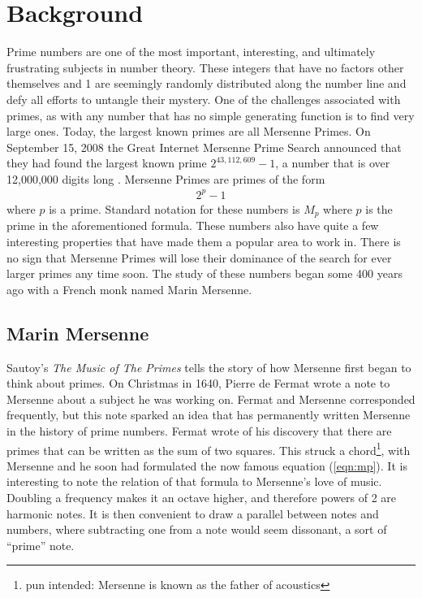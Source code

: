 \section{Background}

Prime numbers are one of the most important, interesting, and ultimately frustrating subjects in number theory. These integers that have no factors other themselves and 1 are seemingly randomly distributed along the number line and defy all efforts to untangle their mystery. One of the challenges associated with primes, as with any number that has no simple generating function is to find very large ones.  Today, the largest known primes are all Mersenne Primes.  On September 15, 2008 the Great Internet Mersenne Prime Search announced that they had found the largest known prime $2^{43,112,609}-1$, a number that is over 12,000,000 digits long \cite{gimps}.  Mersenne Primes are primes of the form 
\begin{align}
2^p - 1
\label{eqn:mp}
\end{align}
where $p$ is a prime.  Standard notation for these numbers is $M_p$ where $p$ is the prime in the aforementioned formula.   These numbers also have quite a few interesting properties that have made them a popular area to work in. There is no sign that Mersenne Primes will lose their dominance of the search for ever larger primes any time soon.  The study of these numbers began some 400 years ago with a French monk named Marin Mersenne. 

\subsection{Marin Mersenne}

Sautoy's \textit{The Music of The Primes} \cite{sautoy} tells the story of how Mersenne first began to think about primes. On Christmas in 1640, Pierre de Fermat wrote a note to Mersenne about a subject he was working on. Fermat and Mersenne corresponded frequently, but this note sparked an idea that has permanently written Mersenne in the history of prime numbers. Fermat wrote of his discovery that there are primes that can be written as the sum of two squares.  This struck a chord\footnote{pun intended: Mersenne is known as the father of acoustics}, with Mersenne and he soon had formulated the now famous equation (\ref{eqn:mp}).  It is interesting to note the relation of that formula to Mersenne's love of music.  Doubling a frequency makes it an octave higher, and therefore powers of 2 are harmonic notes.  It is then convenient to draw a parallel between notes and numbers, where subtracting one from  a note would seem dissonant, a sort of ``prime'' note. 

